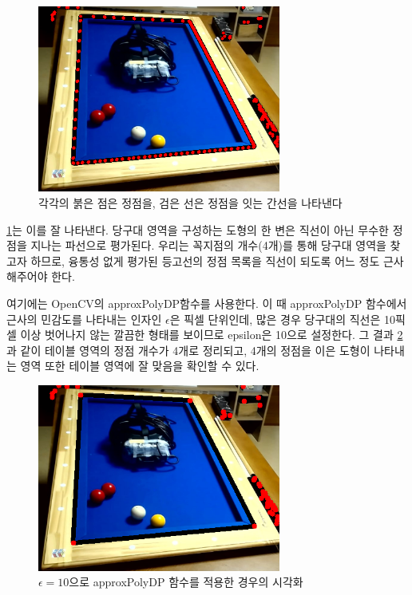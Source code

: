 \documentclass[10pt]{oblivoir}
\begin{document}
\begin{figure}[ht]
    \centering
    \includegraphics[width=8cm]{img/billiards-table-contours-dot-view.png}
    \caption{각각의 붉은 점은 정점을, 검은 선은 정점을 잇는 간선을 나타낸다}
    \label{fig;table-contour-dot-view}
\end{figure}

\cref{fig;table-contour-dot-view}는 이를 잘 나타낸다. 당구대 영역을 구성하는 도형의 한 변은 직선이 아닌 무수한 정점을 지나는 파선으로 평가된다. 우리는 꼭지점의 개수(4개)를 통해 당구대 영역을 찾고자 하므로, 융통성 없게 평가된 등고선의 정점 목록을 직선이 되도록 어느 정도 근사해주어야 한다.

여기에는 OpenCV의 approxPolyDP\footnotemark 함수를 사용한다. 이 때 approxPolyDP 함수에서 근사의 민감도를 나타내는 인자인 $\epsilon$은 픽셀 단위인데, 많은 경우 당구대의 직선은 10픽셀 이상 벗어나지 않는 깔끔한 형태를 보이므로 epsilon은 10으로 설정한다. 그 결과 \cref{fig;table-contour-dot-view-approx}과 같이 테이블 영역의 정점 개수가 4개로 정리되고, 4개의 정점을 이은 도형이 나타내는 영역 또한 테이블 영역에 잘 맞음을 확인할 수 있다.

\begin{figure}[ht]
    \centering
    \includegraphics[width=8cm]{img/billiards-table-contours-dot-view-approx.png}
    \caption{$\epsilon=10$으로 approxPolyDP 함수를 적용한 경우의 시각화}
    \label{fig;table-contour-dot-view-approx}
\end{figure}
\end{document}
